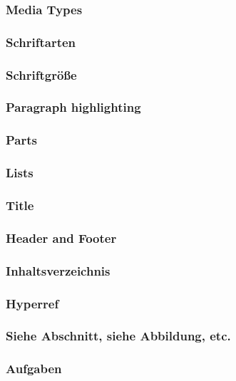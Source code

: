 \subsubsection{Media Types}


\subsubsection{Schriftarten}


\subsubsection{Schriftgröße}


\subsubsection{Paragraph highlighting}




\subsubsection{Parts}


\subsubsection{Lists}


\subsubsection{Title}


\subsubsection{Header and Footer}


\subsubsection{Inhaltsverzeichnis}


\subsubsection{Hyperref}


\subsubsection{Siehe Abschnitt, siehe Abbildung, etc.}


\subsubsection{Aufgaben}

